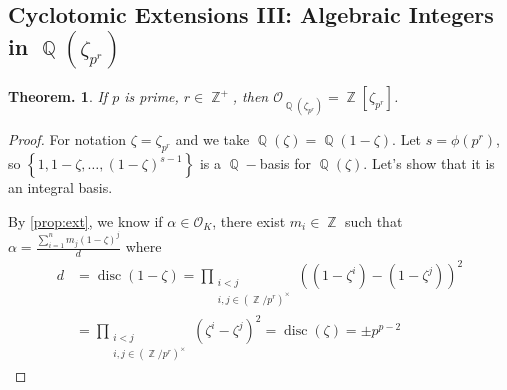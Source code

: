 \documentclass[11pt, a4paper]{memoir}
\DeclareMathOperator{\Q}{{\mathbb{Q}}}
\DeclareMathOperator{\Z}{{\mathbb{Z}}}
\theoremstyle{change}
\newtheorem{theorem}{Theorem.}[section]
\theoremstyle{plain}
\theoremstyle{nonumberplain}
\newtheorem{proof}{Proof}
\DeclareMathOperator{\disc}{disc}
\begin{document}
\subsection{Cyclotomic Extensions III: Algebraic Integers in \texorpdfstring{$\Q(\zeta_{p^r})$}{Qzpr}}
\begin{theorem}\label{thm:cepr}
    If $p$ is prime, $r\in\Z^+$, then $\mathcal{O}_{\Q(\zeta_{p^r})}=\Z[\zeta_{p^r}]$.
\end{theorem}
\begin{proof}
    For notation $\zeta=\zeta_{p^r}$ and we take $\Q(\zeta)=\Q(1-\zeta)$.
    Let $s=\phi(p^r)$, so $\left\{1,1-\zeta,\ldots,(1-\zeta)^{s-1}\right\}$ is a $\Q-$basis for $\Q(\zeta)$.
    Let's show that it is an integral basis.

    By \cref{prop:ext}, we know if $\alpha\in\mathcal{O}_K$, there exist $m_i\in\Z$ such that $\alpha=\frac{\sum_{i=1}^n m_j(1-\zeta)^j}{d}$ where
    \begin{align*}
        d &= \disc(1-\zeta)= \prod_{\substack{i<j\\i,j\in(\Z/p^r)^\times}}((1-\zeta^i)-(1-\zeta^j))^2\\
          &= \prod_{\substack{i<j\\i,j\in(\Z/p^r)^\times}}(\zeta^i-\zeta^j)^2= \disc(\zeta)=\pm p^{p-2}
    \end{align*}


\end{proof}
\end{document}
